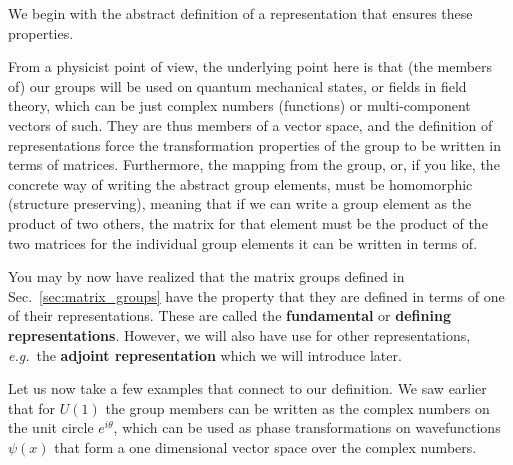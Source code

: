 \documentclass[notes.tex]{subfiles}
\begin{document}
We begin with the abstract definition of a representation that ensures these properties. 

From a physicist point of view, the underlying point here is that (the members of) our groups will be used on quantum mechanical states, or fields in field theory, which can be just complex numbers (functions) or multi-component vectors of such. They are thus members of a vector space, and the definition of representations force the transformation properties of the group to be written in terms of matrices. Furthermore, the mapping from the group, or, if you like, the concrete way of writing the abstract group elements, must be homomorphic (structure preserving), meaning that if we can write a group element as the product of two others, the matrix for that element must be the product of the two matrices for the individual group elements it can be written in terms of.

You may by now have realized that the matrix groups defined in Sec.~\ref{sec:matrix_groups} have the property that they are defined in terms of one of their representations. These are called the {\bf fundamental} or {\bf defining  representations}. However, we will also have use for other representations, {\it e.g.}\ the {\bf adjoint representation} which we will introduce later.

Let us now take a few examples that connect to our definition. We saw earlier that for $U(1)$ the group members can be written as the complex numbers on the unit circle $e^{i \theta}$, which can be used as phase transformations on wavefunctions $\psi(x)$ that form a one dimensional vector space over the complex numbers. 
\end{document}
